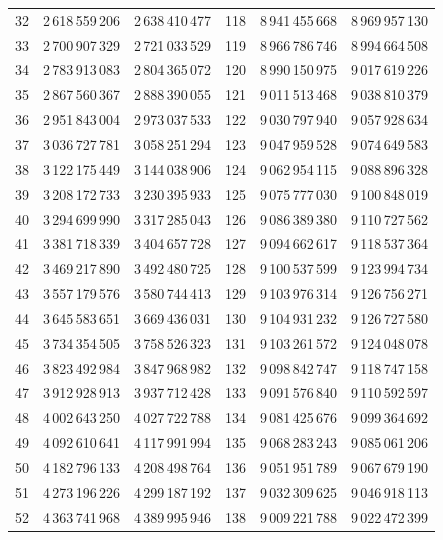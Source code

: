 \begin{longtable}{@{}r r r@{\qquad\qquad}r r r@{}}
32 & 2\,618\,559\,206 & 2\,638\,410\,477 & 118 & 8\,941\,455\,668 & 8\,969\,957\,130\\
33 & 2\,700\,907\,329 & 2\,721\,033\,529 & 119 & 8\,966\,786\,746 & 8\,994\,664\,508\\
34 & 2\,783\,913\,083 & 2\,804\,365\,072 & 120 & 8\,990\,150\,975 & 9\,017\,619\,226\\
35 & 2\,867\,560\,367 & 2\,888\,390\,055 & 121 & 9\,011\,513\,468 & 9\,038\,810\,379\\
36 & 2\,951\,843\,004 & 2\,973\,037\,533 & 122 & 9\,030\,797\,940 & 9\,057\,928\,634\\
37 & 3\,036\,727\,781 & 3\,058\,251\,294 & 123 & 9\,047\,959\,528 & 9\,074\,649\,583\\
38 & 3\,122\,175\,449 & 3\,144\,038\,906 & 124 & 9\,062\,954\,115 & 9\,088\,896\,328\\
39 & 3\,208\,172\,733 & 3\,230\,395\,933 & 125 & 9\,075\,777\,030 & 9\,100\,848\,019\\
40 & 3\,294\,699\,990 & 3\,317\,285\,043 & 126 & 9\,086\,389\,380 & 9\,110\,727\,562\\
41 & 3\,381\,718\,339 & 3\,404\,657\,728 & 127 & 9\,094\,662\,617 & 9\,118\,537\,364\\
42 & 3\,469\,217\,890 & 3\,492\,480\,725 & 128 & 9\,100\,537\,599 & 9\,123\,994\,734\\
43 & 3\,557\,179\,576 & 3\,580\,744\,413 & 129 & 9\,103\,976\,314 & 9\,126\,756\,271\\
44 & 3\,645\,583\,651 & 3\,669\,436\,031 & 130 & 9\,104\,931\,232 & 9\,126\,727\,580\\
45 & 3\,734\,354\,505 & 3\,758\,526\,323 & 131 & 9\,103\,261\,572 & 9\,124\,048\,078\\
46 & 3\,823\,492\,984 & 3\,847\,968\,982 & 132 & 9\,098\,842\,747 & 9\,118\,747\,158\\
47 & 3\,912\,928\,913 & 3\,937\,712\,428 & 133 & 9\,091\,576\,840 & 9\,110\,592\,597\\
48 & 4\,002\,643\,250 & 4\,027\,722\,788 & 134 & 9\,081\,425\,676 & 9\,099\,364\,692\\
49 & 4\,092\,610\,641 & 4\,117\,991\,994 & 135 & 9\,068\,283\,243 & 9\,085\,061\,206\\
50 & 4\,182\,796\,133 & 4\,208\,498\,764 & 136 & 9\,051\,951\,789 & 9\,067\,679\,190\\
51 & 4\,273\,196\,226 & 4\,299\,187\,192 & 137 & 9\,032\,309\,625 & 9\,046\,918\,113\\
52 & 4\,363\,741\,968 & 4\,389\,995\,946 & 138 & 9\,009\,221\,788 & 9\,022\,472\,399\\

\end{longtable}
